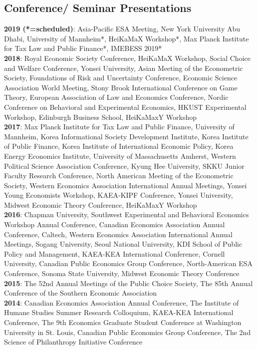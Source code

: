 \documentclass[margin, letterpaper]{res}
\begin{document}
\begin{resume}
\section{Conference/ Seminar Presentations}
\textbf{2019 (*=scheduled)}: Asia-Pacific ESA Meeting, New York University Abu Dhabi, University of Mannheim*, HeiKaMaX Workshop*, Max Planck Institute for Tax Law and Public Finance*, IMEBESS 2019*\\
\textbf{2018}: Royal Economic Society Conference, HeiKaMaX Workshop, Social Choice and Welfare Conference, Yonsei University, Asian Meeting of the Econometric Society, Foundations of Risk and Uncertainty Conference, Economic Science Association World Meeting, Stony Brook International Conference on Game Theory, European Association of Law and Economics Conference, Nordic Conference on Behavioral and Experimental Economics, HKUST Experimental Workshop, Edinburgh Business School, HeiKaMaxY Workshop\\
\textbf{2017}: Max Planck Institute for Tax Law and Public Finance, University of Mannheim, Korea Informational Society Development Institute, Korea Institute of Public Finance, Korea Institute of International Economic Policy, Korea Energy Economics Institute, University of Massachusetts Amherst, Western Political Science Association Conference, Kyung Hee University, SKKU Junior Faculty Research Conference, North American Meeting of the Econometric Society, Western Economics Association International Annual Meetings, Yonsei Young Economists Workshop, KAEA-KIPF Conference, Yonsei University, Midwest Economic Theory Conference, HeiKaMaxY Workshop\\
\textbf{2016}: Chapman University, Southwest Experimental and Behavioral Economics Workshop Annual Conference, Canadian Economics Association Annual Conference, Caltech, Western Economics Association International Annual Meetings, Sogang University, Seoul National University, KDI School of Public Policy and Management, KAEA-KEA International Conference, Cornell University, Canadian Public Economics Group Conference, North-American ESA Conference, Sonoma State University, Midwest Economic Theory Conference\\
\textbf{2015}: The 52nd Annual Meetings of the Public Choice Society, The 85th Annual Conference of the Southern Economic Association\\
\textbf{2014}: Canadian Economics Association Annual Conference, The Institute of Humane Studies Summer Research Colloquium, KAEA-KEA International Conference, The 9th Economics Graduate Student Conference at Washington University in St. Louis, Canadian Public Economics Group Conference, The 2nd Science of Philanthropy Initiative Conference


\end{resume}
\end{document}
